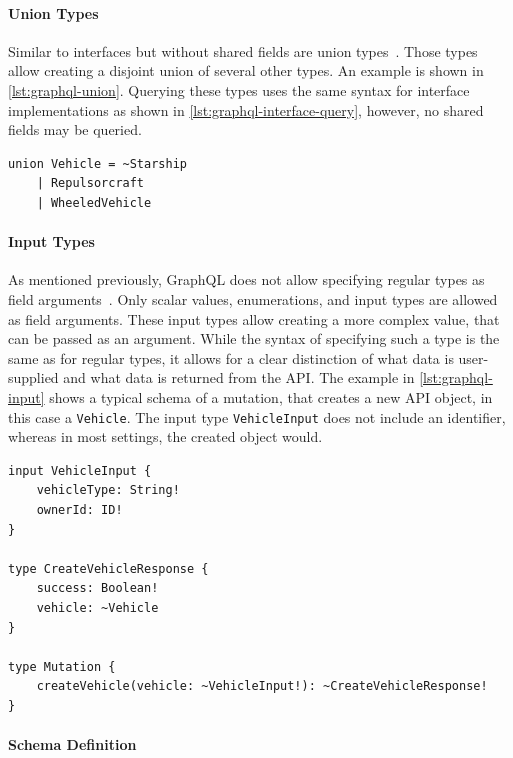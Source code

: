 \paragraph{Union Types}

Similar to interfaces but without shared fields are union types~\cite{Facebook2018, Diaz2020}.
Those types allow creating a disjoint union of several other types.
An example is shown in \autoref{lst:graphql-union}.
Querying these types uses the same syntax for interface implementations as shown in \autoref{lst:graphql-interface-query}, however, no shared fields may be queried. 

\begin{lstlisting}[caption={Union Types in GraphQL}, language=graphqls, label={lst:graphql-union}]
union Vehicle = ~Starship
    | Repulsorcraft
    | WheeledVehicle
\end{lstlisting}

\paragraph{Input Types} 

As mentioned previously, GraphQL does not allow specifying regular types as field arguments~\cite{Facebook2018}.
Only scalar values, enumerations, and input types are allowed as field arguments.
These input types allow creating a more complex value, that can be passed as an argument.
While the syntax of specifying such a type is the same as for regular types, it allows for a clear distinction of what data is user-supplied and what data is returned from the \ac{API}.
The example in \autoref{lst:graphql-input} shows a typical schema of a mutation, that creates a new \ac{API} object, in this case a \texttt{Vehicle}.
The input type \texttt{VehicleInput} does not include an identifier, whereas in most settings, the created object would.

\begin{lstlisting}[caption={Input Types}, language=graphqls, label={lst:graphql-input}]
input VehicleInput {
    vehicleType: String!
    ownerId: ID!
}

type CreateVehicleResponse {
    success: Boolean!
    vehicle: ~Vehicle
}

type Mutation {
    createVehicle(vehicle: ~VehicleInput!): ~CreateVehicleResponse!
}
\end{lstlisting}

\paragraph{Schema Definition}

